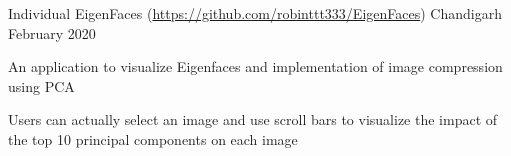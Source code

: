 \begin{cventries}
\cventry
{Individual} %
{EigenFaces \scriptsize(\url{https://github.com/robinttt333/EigenFaces})} %
{Chandigarh} %
{February 2020 } %
{ %
\begin{cvitems}
\item {An application to visualize Eigenfaces and implementation of image compression using PCA}
\item {Users can actually select an image and use scroll bars to visualize the impact of the top 10 principal components on each image}
\end{cvitems}
}

\end{cventries}